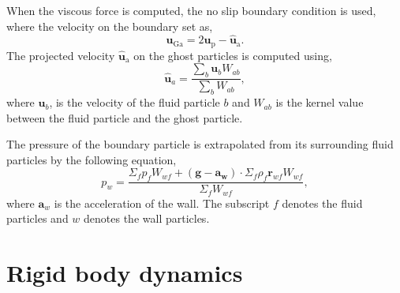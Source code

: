 \documentclass[preprint,12pt]{elsarticle}
\newcommand{\ten}[1]{\ensuremath{\mathbf{#1}}}
\begin{document}
When the viscous force is computed, the no slip boundary condition is used,
where the velocity on the boundary set as,
\begin{equation}
  \label{eq:no-slip-bc-u}
  \ten{u}_{\text{Ga}} = 2 \ten{u}_{\text{p}} - \ten{\hat{u}}_{\text{a}}.
\end{equation}
The projected velocity $\ten{\hat{u}}_{\text{a}}$ on the ghost particles is
computed using,
\begin{equation}
  \label{eq:v-ghost}
  \ten{\hat{u}}_a = \frac{\sum_b\ten{u}_b W_{ab}}{\sum_b W_{ab}},
\end{equation}
where $\ten{u}_b$, is the velocity of the fluid particle $b$ and $W_{ab}$ is the kernel
value between the fluid particle and the ghost particle.


The pressure of the boundary particle is extrapolated from its surrounding
fluid particles by the following equation,
\begin{equation}
  \label{eq:pressure-bc}
  p_w = \frac{\Sigma_f p_f W_{wf} + (\ten{g} - \ten{a}_{\ten{w}}) \cdot \Sigma_f
    \rho_f \ten{r}_{wf} W_{wf}}{\Sigma_f W_{wf}},
\end{equation}
where $\ten{a}_w$ is the acceleration of the wall. The subscript $f$ denotes
the fluid particles and $w$ denotes the wall particles.



\FloatBarrier%
\section{Rigid body dynamics}
\label{sec:rbd}

\end{document}

